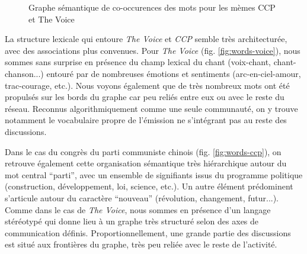 \begin{figure}[h!]
    \centering
    
  \caption{
    Graphe sémantique de co-occurences des mots pour les mèmes CCP et The Voice
  }
\end{figure}

 La structure lexicale qui entoure \textit{The Voice }et \textit{CCP }semble très architecturée, avec des associations plus convenues. Pour \textit{The Voice} (fig. \ref{fig:words-voice}), nous sommes sans surprise en présence du champ lexical du chant (voix-chant, chant-chanson...) entouré par de nombreuses émotions et sentiments (arc-en-ciel-amour, trac-courage, etc.). Nous voyons également que de très nombreux mots ont été propulsés sur les bords du graphe car peu reliés entre eux ou avec le reste du réseau. Reconnus algorithmiquement comme une seule communauté, on y trouve notamment le vocabulaire propre de l{\textquoteright}émission ne s{\textquoteright}intégrant pas au reste des discussions. 

Dans le cas du congrès du parti communiste chinois (fig. \ref{fig:words-ccp}), on retrouve également cette organisation sémantique très hiérarchique autour du mot central {\textquotedblleft}parti{\textquotedblright}, avec un ensemble de signifiants issus du programme politique (construction, développement, loi, science, etc.). Un autre élément prédominent s{\textquoteright}articule autour du caractère {\textquotedblleft}nouveau{\textquotedblright} (révolution, changement, futur...). Comme dans le cas de \textit{The Voice}, nous sommes en présence d{\textquoteright}un langage stéréotypé qui donne lieu \`a un graphe très structuré selon des axes de communication définis. Proportionnellement, une grande partie des discussions est situé aux frontières du graphe, très peu reliée avec le reste de l{\textquoteright}activité.

